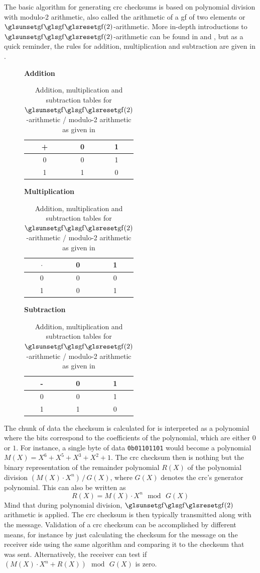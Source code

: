 The basic algorithm for generating \gls{crc} checksums is based on polynomial division with modulo-2 arithmetic, also called the arithmetic of a \gls{gf} of two elements or $\GF(2)$-arithmetic.
More in-depth introductions to $\GF(2)$-arithmetic can be found in \cite[Section 2.2]{ecctechniques} and \cite[Section 3.2]{ecctechniques}, but as a quick reminder, the rules for addition, multiplication and subtraction are given in .

\begin{table}[h]
\centering
\begin{subfigure}{0.2\textwidth}
	\centering
	\textbf{Addition}
	\vskip 0.2cm
	\begin{tabular}{c | c c}
		+ & 0 & 1 \\ \hline
		0 & 0 & 1 \\
		1 & 1 & 0
	\end{tabular}
\end{subfigure}
\begin{subfigure}{0.2\textwidth}
	\centering
	\textbf{Multiplication}
	\vskip 0.2cm
	\begin{tabular}{c | c c}
		$\cdot$ & 0 & 1 \\ \hline
		0 & 0 & 0 \\
		1 & 0 & 1
	\end{tabular}
\end{subfigure}
\begin{subfigure}{0.2\textwidth}
	\centering
	\textbf{Subtraction}
	\vskip 0.2cm
	\begin{tabular}{c | c c}
		- & 0 & 1 \\ \hline
		0 & 0 & 1 \\
		1 & 1 & 0
	\end{tabular}
\end{subfigure}
\caption{Addition, multiplication and subtraction tables for $\GF(2)$-arithmetic / modulo-2 arithmetic as given in \cite[Section 2.2]{ecctechniques}}
\label{tab:gf_rules}
\end{table}

The chunk of data the checksum is calculated for is interpreted as a polynomial where the bits correspond to the coefficients of the polynomial, which are either $0$ or $1$.
For instance, a single byte of data \texttt{0b01101101} would become a polynomial $M(X) = X^6 + X^5 + X^3 + X^2 + 1$.
The \gls{crc} checksum then is nothing but the binary representation of the remainder polynomial $R(X)$ of the polynomial division $(M(X) \cdot X^n) \, / \, G(X)$, where $G(X)$ denotes the \gls{crc}'s generator polynomial.
This can also be written as
\begin{equation}
	R(X) = M(X) \cdot X^n \,\bmod\, G(X)
	\label{eq:crc_basic_equation}
\end{equation}
Mind that during polynomial division, $\GF(2)$ arithmetic is applied.
The \gls{crc} checksum is then typically transmitted along with the message.
Validation of a \gls{crc} checksum can be accomplished by different means, for instance by just calculating the checksum for the message on the receiver side using the same algorithm and comparing it to the checksum that was sent.
Alternatively, the receiver can test if $(M(X) \cdot X^n  + R(X)) \, \bmod \, G(X)$ is zero.

